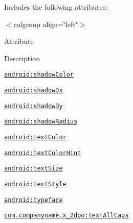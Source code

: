 Includes the following attributes: \begin{TabularC}{0}
\hline
\end{TabularC}
$<$colgroup align=\char`\"{}left\char`\"{}$>$ 

Attribute

Description 

{\tt \hyperlink{classandroid_1_1support_1_1v4_1_1_r_1_1styleable_18256235d0d912eac257e48967b04d1e}{android:shadowColor}}

{\tt \hyperlink{classandroid_1_1support_1_1v4_1_1_r_1_1styleable_caca2f26badd9c92b5b0111fb4411167}{android:shadowDx}}

{\tt \hyperlink{classandroid_1_1support_1_1v4_1_1_r_1_1styleable_df8c466194468431db1ca727606ba7db}{android:shadowDy}}

{\tt \hyperlink{classandroid_1_1support_1_1v4_1_1_r_1_1styleable_843e7e567e8b26d9c44db983122edc52}{android:shadowRadius}}

{\tt \hyperlink{classandroid_1_1support_1_1v4_1_1_r_1_1styleable_0763260e2c7644b0c1ff2a7c911c03af}{android:textColor}}

{\tt \hyperlink{classandroid_1_1support_1_1v4_1_1_r_1_1styleable_13b2c5daf5c13f138a2f6590d38a3f8c}{android:textColorHint}}

{\tt \hyperlink{classandroid_1_1support_1_1v4_1_1_r_1_1styleable_0ef17f89c7c229543a6ba3224cc45bde}{android:textSize}}

{\tt \hyperlink{classandroid_1_1support_1_1v4_1_1_r_1_1styleable_0613c7992a55173fc1d4760327545d8a}{android:textStyle}}

{\tt \hyperlink{classandroid_1_1support_1_1v4_1_1_r_1_1styleable_6c3c73a9cbb806db9a963cfd57cf2040}{android:typeface}}

{\tt \hyperlink{classandroid_1_1support_1_1v4_1_1_r_1_1styleable_d6fbed48414bfa4d49f846b006cb67af}{com.companyname.x\_\-2doo:textAllCaps}}

